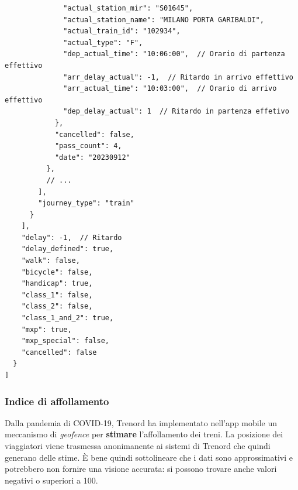 \documentclass[12pt,italian]{report}
\begin{document}
\begin{verbatim}
              "actual_station_mir": "S01645",
              "actual_station_name": "MILANO PORTA GARIBALDI",
              "actual_train_id": "102934",
              "actual_type": "F",
              "dep_actual_time": "10:06:00",  // Orario di partenza effettivo
              "arr_delay_actual": -1,  // Ritardo in arrivo effettivo
              "arr_actual_time": "10:03:00",  // Orario di arrivo effettivo
              "dep_delay_actual": 1  // Ritardo in partenza effetivo
            },
            "cancelled": false,
            "pass_count": 4,
            "date": "20230912"
          },
          // ...
        ],
        "journey_type": "train"
      }
    ],
    "delay": -1,  // Ritardo
    "delay_defined": true,
    "walk": false,
    "bicycle": false,
    "handicap": true,
    "class_1": false,
    "class_2": false,
    "class_1_and_2": true,
    "mxp": true,
    "mxp_special": false,
    "cancelled": false
  }
]
\end{verbatim}

\subsubsection{Indice di affollamento}

Dalla pandemia di COVID-19, Trenord ha implementato nell'app mobile un
meccanismo di \textit{geofence} per \textbf{stimare} l'affollamento
dei treni.  La posizione dei viaggiatori viene trasmessa anonimanente
ai sistemi di Trenord che quindi generano delle stime.  È bene quindi
sottolineare che i dati sono approssimativi e potrebbero non fornire
una visione accurata: si possono trovare anche valori negativi o
superiori a 100.
\end{document}
